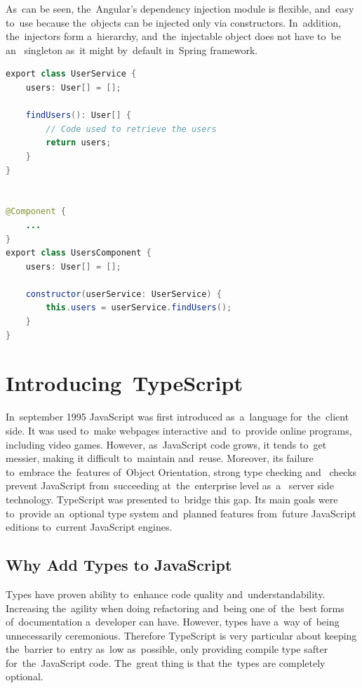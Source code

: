 As~can be seen, the~Angular's dependency injection module is flexible, and~easy
to~use because the~objects can be injected only via constructors. In~addition,
the~injectors form a~hierarchy, and~the~injectable object does not have to~be
an~ singleton as~it might by~default in~Spring
framework.
\pagebreak

\begin{lstlisting}[caption=An~example of~dependency injection in~Angular.,
label=lst-angular-service, style=dp-default, language=Java]
export class UserService {
	users: User[] = [];
	
	findUsers(): User[] {
		// Code used to retrieve the users
		return users;
	}
}


@Component {
	...
}
export class UsersComponent {
	users: User[] = [];
	
	constructor(userService: UserService) {
		this.users = userService.findUsers();
	}
}
\end{lstlisting}


\section{Introducing~TypeScript}
\label{TypeScript}
In~september 1995 JavaScript was first introduced as~a~language for~the~client
side. It was used to~make webpages interactive and~to~provide online programs,
including video games. However, as~JavaScript code grows, it tends to~get
messier, making it difficult to~maintain and~reuse. Moreover, its failure
to~embrace the~features of~Object Orientation, strong type checking
and~ checks prevent JavaScript from~succeeding
at~the~enterprise level as~a~ server side technology.
TypeScript was presented to~bridge this gap. Its main goals were to~provide
an~optional type system and~planned features from~future JavaScript editions
to~current JavaScript engines.


\subsection{Why Add Types to JavaScript}
Types have proven ability to~enhance code quality and~understandability.
Increasing the~agility when doing refactoring and~being one of~the~best forms
of~documentation a~developer can have. However, types have a~way of~being
unnecessarily ceremonious. Therefore TypeScript is very particular about keeping
the~barrier to~entry as~low as~possible, only providing compile type safter
for~the~JavaScript code. The~great thing is that the~types are completely
optional.

